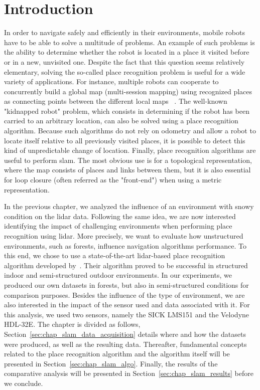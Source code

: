 \section{Introduction}
\label{sec:chap_slam_intro}

In order to navigate safely and efficiently in their environments, mobile robots have to be able to solve a multitude of problems. An example of such problems is the ability to determine whether the robot is located in a place it visited before or in a new, unvisited one.  Despite the fact that this question seems relatively elementary, solving the so-called place recognition problem is useful for a wide variety of applications. For instance, multiple robots can cooperate to concurrently build a global map (multi-session mapping) using recognized places as connecting points between the different local maps ~\citep{Howard2004}. The well-known "kidnapped robot" problem, which consists in determining if the robot has been carried to an arbitrary location, can also be solved using a place recognition algorithm. Because such algorithms do not rely on odometry and allow a robot to locate itself relative to all previously visited places, it is possible to detect this kind of unpredictable change of location. Finally, place recognition algorithms are useful to perform \gls*{slam}. The most obvious use is for a topological representation, where the map consists of places and links between them, but it is also essential for loop closure (often referred as the "front-end") when using a metric representation. 


In the previous chapter, we analyzed the influence of an environment with snowy condition on the \gls*{lidar} data. Following the same idea, we are now interested identifying the impact of challenging environments when performing place recognition using \gls*{lidar}. More precisely, we want to evaluate how unstructured environments, such as forests, influence navigation algorithms performance. To this end, we chose to use a state-of-the-art \gls*{lidar}-based place recognition algorithm developed by~\citet{Steder2011b}. Their algorithm proved to be successful in structured indoor and semi-structured outdoor environments. In our experiments, we produced our own datasets in forests, but also in semi-structured conditions for comparison purposes. Besides the influence of the type of environment, we are also interested in the impact of the sensor used and data associated with it. For this analysis, we used two sensors, namely the SICK LMS151 and the Velodyne HDL-32E. The chapter is divided as follows, Section~\ref{sec:chap_slam_data_acquisition} details where and how the datasets were produced, as well as the resulting data. Thereafter, fundamental concepts related to the place recognition algorithm and the algorithm itself will be presented in Section~\ref{sec:chap_slam_algo}. Finally, the results of the comparative analysis will be presented in Section~\ref{sec:chap_slam_results} before we conclude.


